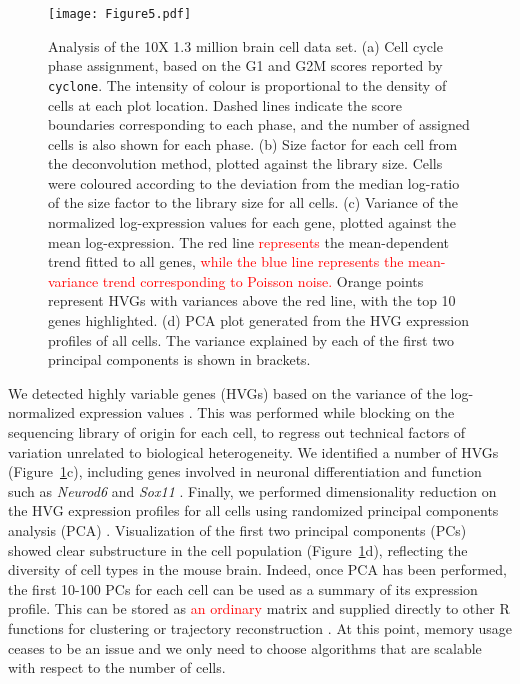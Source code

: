 \documentclass[10pt,letterpaper]{article}
\newcommand{\code}[1]{\texttt{#1}}
\newcommand{\revised}[1]{\textcolor{red}{#1}}
\begin{document}
\begin{figure}
    \begin{center}
        \texttt{[image: Figure5.pdf]}
    \end{center}
    \caption{Analysis of the 10X 1.3 million brain cell data set.
        (a) Cell cycle phase assignment, based on the G1 and G2M scores reported by \code{cyclone}.
        The intensity of colour is proportional to the density of cells at each plot location.
        Dashed lines indicate the score boundaries corresponding to each phase, and the number of assigned cells is also shown for each phase.
        (b) Size factor for each cell from the deconvolution method, plotted against the library size.
        Cells were coloured according to the deviation from the median log-ratio of the size factor to the library size for all cells.
        (c) Variance of the normalized log-expression values for each gene, plotted against the mean log-expression.
        The red line \revised{represents} the mean-dependent trend fitted to all genes, \revised{while the blue line represents the mean-variance trend corresponding to Poisson noise.}
        Orange points represent HVGs with variances above the red line, with the top 10 genes highlighted.
        (d) PCA plot generated from the HVG expression profiles of all cells.
        The variance explained by each of the first two principal components is shown in brackets.
    }
    \label{fig:tenx}
\end{figure}

We detected highly variable genes (HVGs) based on the variance of the log-normalized expression values \cite{lun2016stepbystep}.
This was performed while blocking on the sequencing library of origin for each cell, to regress out technical factors of variation unrelated to biological heterogeneity.
We identified a number of HVGs (Figure~\ref{fig:tenx}c), including genes involved in neuronal differentiation and function such as \textit{Neurod6} \cite{ kay2011neurod6} and \textit{Sox11} \cite{bergsland2006establishment}. 
Finally, we performed dimensionality reduction on the HVG expression profiles for all cells using randomized principal components analysis (PCA) \cite{halko2011finding}.
Visualization of the first two principal components (PCs) showed clear substructure in the cell population (Figure~\ref{fig:tenx}d), reflecting the diversity of cell types in the mouse brain.
Indeed, once PCA has been performed, the first 10-100 PCs for each cell can be used as a summary of its expression profile.
This can be stored as \revised{an ordinary} matrix and supplied directly to other R functions for clustering \cite{xu2015identification,csardi2006igraph} or trajectory reconstruction \cite{trapnell2014dynamics}.
At this point, memory usage ceases to be an issue and we only need to choose algorithms that are scalable with respect to the number of cells.
\end{document}
